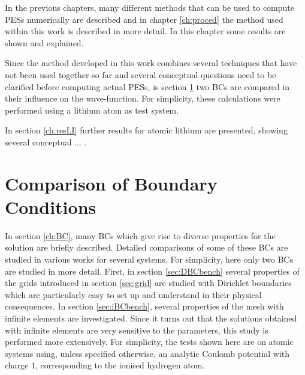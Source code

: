 \label{ch:res}
In the previous chapters, many different methods that can be used to compute PESs numerically are described and in chapter \ref{ch:proced} the method used within this work is described in more detail.
In this chapter some results are shown and explained.

Since the method developed in this work combines several techniques that have not been used together so far and several conceptual questions need to be clarified before computing actual PESs, is section \ref{ch:BCbench} two BCs are compared in their influence on the wave-function. %
For simplicity, these calculations were performed using a lithium atom as test system.

In section \ref{ch:resLI} further results for atomic lithium are presented, showing several conceptual ... .


\section{Comparison of Boundary Conditions}
\label{ch:BCbench}
In section \ref{ch:BC}, many BCs which give rise to diverse properties for the solution are briefly described.
Detailed comparisons of some of these BCs are studied in various works \cite{babuska,artBC,capComp,absRev,nrBCrev} for several systems.
For simplicity, here only two BCs are studied in more detail.
First, in section \ref{sec:DBCbench} several properties of the grids introduced in section \ref{sec:grid} are studied with Dirichlet boundaries which are particularly easy to set up and understand in their physical consequences.
In section \ref{sec:iBCbench}, several properties of the mesh with infinite elements are investigated.
Since it turns out that the solutions obtained with infinite elements are very sensitive to the parameters, this study is performed more extensively.
For simplicity, the tests shown here are on atomic systems using, unless specified otherwise, an analytic Coulomb potential with charge $1$, corresponding to the ionised hydrogen atom.

